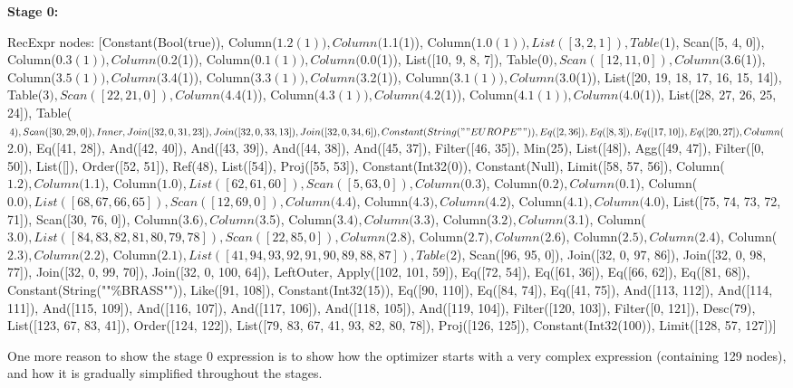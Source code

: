 \documentclass[a4paper,12pt]{scrreprt}
\begin{document}
\textbf{Stage 0:}

\begin{exprlisting}
RecExpr { nodes: [Constant(Bool(true)), Column($1.2(1)), Column($1.1(1)), Column($1.0(1)), List([3, 2, 1]), Table($1), Scan([5, 4, 0]), Column($0.3(1)), Column($0.2(1)), Column($0.1(1)), Column($0.0(1)), List([10, 9, 8, 7]), Table($0), Scan([12, 11, 0]), Column($3.6(1)), Column($3.5(1)), Column($3.4(1)), Column($3.3(1)), Column($3.2(1)), Column($3.1(1)), Column($3.0(1)), List([20, 19, 18, 17, 16, 15, 14]), Table($3), Scan([22, 21, 0]), Column($4.4(1)), Column($4.3(1)), Column($4.2(1)), Column($4.1(1)), Column($4.0(1)), List([28, 27, 26, 25, 24]), Table($4), Scan([30, 29, 0]), Inner, Join([32, 0, 31, 23]), Join([32, 0, 33, 13]), Join([32, 0, 34, 6]), Constant(String(""EUROPE"")), Eq([2, 36]), Eq([8, 3]), Eq([17, 10]), Eq([20, 27]), Column($2.0), Eq([41, 28]), And([42, 40]), And([43, 39]), And([44, 38]), And([45, 37]), Filter([46, 35]), Min(25), List([48]), Agg([49, 47]), Filter([0, 50]), List([]), Order([52, 51]), Ref(48), List([54]), Proj([55, 53]), Constant(Int32(0)), Constant(Null), Limit([58, 57, 56]), Column($1.2), Column($1.1), Column($1.0), List([62, 61, 60]), Scan([5, 63, 0]), Column($0.3), Column($0.2), Column($0.1), Column($0.0), List([68, 67, 66, 65]), Scan([12, 69, 0]), Column($4.4), Column($4.3), Column($4.2), Column($4.1), Column($4.0), List([75, 74, 73, 72, 71]), Scan([30, 76, 0]), Column($3.6), Column($3.5), Column($3.4), Column($3.3), Column($3.2), Column($3.1), Column($3.0), List([84, 83, 82, 81, 80, 79, 78]), Scan([22, 85, 0]), Column($2.8), Column($2.7), Column($2.6), Column($2.5), Column($2.4), Column($2.3), Column($2.2), Column($2.1), List([41, 94, 93, 92, 91, 90, 89, 88, 87]), Table($2), Scan([96, 95, 0]), Join([32, 0, 97, 86]), Join([32, 0, 98, 77]), Join([32, 0, 99, 70]), Join([32, 0, 100, 64]), LeftOuter, Apply([102, 101, 59]), Eq([72, 54]), Eq([61, 36]), Eq([66, 62]), Eq([81, 68]), Constant(String(""\%BRASS"")), Like([91, 108]), Constant(Int32(15)), Eq([90, 110]), Eq([84, 74]), Eq([41, 75]), And([113, 112]), And([114, 111]), And([115, 109]), And([116, 107]), And([117, 106]), And([118, 105]), And([119, 104]), Filter([120, 103]), Filter([0, 121]), Desc(79), List([123, 67, 83, 41]), Order([124, 122]), List([79, 83, 67, 41, 93, 82, 80, 78]), Proj([126, 125]), Constant(Int32(100)), Limit([128, 57, 127])] }
\end{exprlisting}

One more reason to show the stage 0 expression is to show how the optimizer starts with a very complex expression (containing 129 nodes), and how it is gradually simplified throughout the stages. \\
\end{document}
